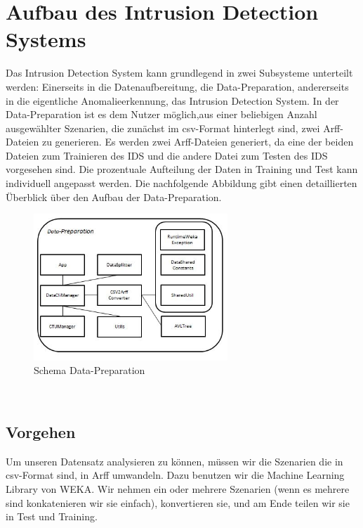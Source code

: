 \documentclass[main.tex]{subfiles}
\begin{document}
\section{Aufbau des Intrusion Detection Systems}

Das Intrusion Detection System kann grundlegend in zwei Subsysteme unterteilt werden: Einerseits in die Datenaufbereitung, die Data-Preparation, andererseits in die eigentliche Anomalieerkennung, das Intrusion Detection System.
In der Data-Preparation ist es dem Nutzer möglich,aus einer beliebigen Anzahl ausgewählter Szenarien, die zunächst im csv-Format hinterlegt sind, zwei Arff-Dateien zu generieren. Es werden zwei Arff-Dateien generiert, da eine der beiden Dateien zum Trainieren des IDS und die andere Datei zum Testen des IDS vorgesehen sind. Die prozentuale Aufteilung der Daten in Training und Test kann individuell angepasst werden. Die nachfolgende Abbildung gibt einen detaillierten Überblick über den Aufbau der Data-Preparation.\\

%
\begin{figure}[ht]
 \centering
 \includegraphics[width=0.65\textwidth]{images/Schema_Data_Preparation.jpg}
 \caption{Schema Data-Preparation}
 \label{schema_data_preparation}
\end{figure}
\ \\ 
\subsection {Vorgehen}
Um unseren Datensatz analysieren zu können, müssen wir die Szenarien die in csv-Format sind, in Arff umwandeln.
Dazu benutzen wir die Machine Learning Library von WEKA.
Wir nehmen ein oder mehrere Szenarien (wenn es mehrere sind konkatenieren wir sie einfach), konvertieren sie, und am Ende teilen wir sie in Test und Training.\\
\end{document}
